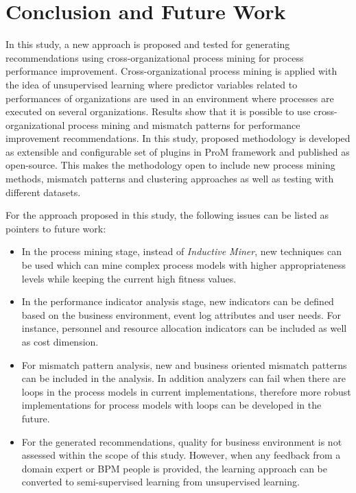 \section{Conclusion and Future Work}
\label{sec:conclusion-and-future-work}

In this study, a new approach is proposed and tested for generating recommendations using cross-organizational process mining for process performance improvement. Cross-organizational process mining is applied with the idea of unsupervised learning where predictor variables related to performances of organizations are used in an environment where processes are executed on several organizations. Results show that it is possible to use cross-organizational process mining and mismatch patterns for performance improvement recommendations. In this study, proposed methodology is developed as extensible and configurable set of plugins in ProM framework \cite{verbeek2010prom} and published as open-source. This makes the methodology open to include new process mining methods, mismatch patterns and clustering approaches as well as testing with different datasets.

For the approach proposed in this study, the following issues can be listed as pointers to future work:
\begin{itemize}
	\item In the process mining stage, instead of \textit{Inductive Miner}, new techniques can be used which can mine complex process models with higher appropriateness levels while keeping the current high fitness values.
	\item In the performance indicator analysis stage, new indicators can be defined based on the business environment, event log attributes and user needs. For instance, personnel and resource allocation indicators can be included as well as cost dimension.
	\item For mismatch pattern analysis, new and business oriented mismatch patterns can be included in the analysis. In addition analyzers can fail when there are loops in the process models in current implementations, therefore more robust implementations for process models with loops can be developed in the future.
	\item For the generated recommendations, quality for business environment is not assessed within the scope of this study. However, when any feedback from a domain expert or BPM people is provided, the learning approach can be converted to semi-supervised learning from unsupervised learning.
\end{itemize}